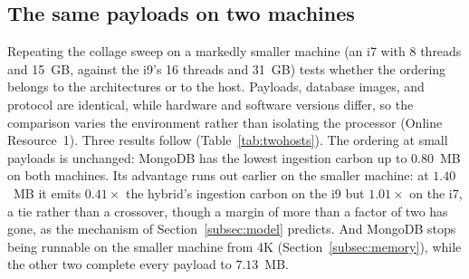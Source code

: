 \documentclass[pdflatex,sn-basic]{sn-jnl}%
\begin{document}
\subsection{The same payloads on two machines}\label{subsec:twohosts}
{\color{markup}Repeating the collage sweep on a markedly smaller machine (an i7 with 8 threads and 15~GB, against the i9's 16 threads and 31~GB) tests whether the ordering belongs to the architectures or to the host.} {\color{markup}Payloads, database images, and protocol are identical, while hardware and software versions differ, so the comparison varies the environment rather than isolating the processor (Online Resource~1).} {\color{markup}Three results follow (Table~\ref{tab:twohosts}).} {\color{markup}The ordering at small payloads is unchanged: MongoDB has the lowest ingestion carbon up to $0.80$~MB on both machines.} {\color{markup}Its advantage runs out earlier on the smaller machine: at $1.40$~MB it emits $0.41\times$ the hybrid's ingestion carbon on the i9 but $1.01\times$ on the i7, a tie rather than a crossover, though a margin of more than a factor of two has gone, as the mechanism of Section~\ref{subsec:model} predicts.} {\color{markup}And MongoDB stops being runnable on the smaller machine from 4K (Section~\ref{subsec:memory}), while the other two complete every payload to $7.13$~MB.}
\end{document}
